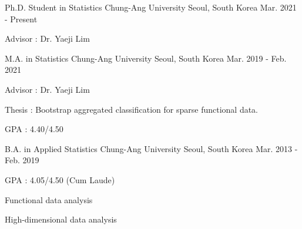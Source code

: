 \documentclass[11pt, a4paper]{awesome-cv} %
\begin{document}
\makecvheader %



\begin{cventries}
	\cventry
	{Ph.D. Student in Statistics} %
	{Chung-Ang University} %
	{Seoul, South Korea} %
	{Mar. 2021 - Present} %
	{ %
		\begin{cvitems}
			\item {Advisor : Dr. Yaeji Lim}
		\end{cvitems}
	}

	\cventry
	{M.A. in Statistics} %
	{Chung-Ang University} %
	{Seoul, South Korea} %
	{Mar. 2019 - Feb. 2021} %
	{ %
		\begin{cvitems}
			\item {Advisor : Dr. Yaeji Lim}
			\item {Thesis : Bootstrap aggregated classification for sparse functional data.}
			\item {GPA : 4.40/4.50}
		\end{cvitems}
	}
	
	\cventry
	{B.A. in Applied Statistics} %
	{Chung-Ang University} %
	{Seoul, South Korea} %
	{Mar. 2013 - Feb. 2019} %
	{ %
		\begin{cvitems}
			\item {GPA : 4.05/4.50 (Cum Laude)}
		\end{cvitems}
	}
\end{cventries}



\begin{cventries}
	\begin{cvitems}
		\begin{spacing}{1.2}
			\item {Functional data analysis}
			\item {High-dimensional data analysis}
		\end{spacing}
	\end{cvitems}
	\vspace{0.5cm}
\end{cventries}
\end{document}
